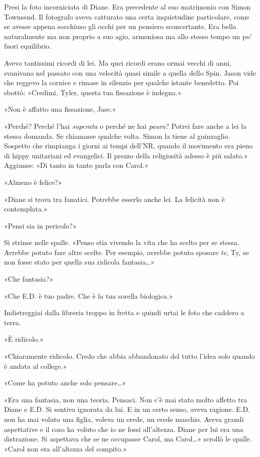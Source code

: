 Presi la foto incorniciata di Diane. Era precedente al suo matrimonio
con Simon Townsend. Il fotografo aveva catturato una certa inquietudine
particolare, come se avesse appena socchiuso gli occhi per un pensiero
sconcertante. Era bella naturalmente ma non proprio a suo agio,
armoniosa ma allo stesso tempo un po' fuori equilibrio.

Avevo tantissimi ricordi di lei. Ma quei ricordi erano ormai vecchi di
anni, svanivano nel passato con una velocità quasi simile a quella dello
Spin. Jason vide che reggevo la cornice e rimase in silenzio per qualche
istante benedetto. Poi sbottò: «Credimi, Tyler, questa tua fissazione è
indegna.»

«Non è affatto una fissazione, Jase.»

«Perché? Perché l'hai \emph{superata} o perché ne hai \emph{paura}?
Potrei fare anche a lei la stessa domanda. Se chiamasse qualche volta.
Simon la tiene al guinzaglio. Sospetto che rimpianga i giorni ai tempi
dell'NR, quando il movimento era pieno di hippy unitariani ed
evangelici. Il prezzo della religiosità adesso è più salato.» Aggiunse:
«Di tanto in tanto parla con Carol.»

«Almeno è felice?»

«Diane si trova tra fanatici. Potrebbe esserlo anche lei. La felicità
non è contemplata.»

«Pensi sia in pericolo?»

Si strinse nelle spalle. «Penso stia vivendo la vita che ha scelto per
se stessa. Avrebbe potuto fare altre scelte. Per esempio, avrebbe potuto
sposare \emph{te}, Ty, se non fosse stato per quella sua ridicola
fantasia\ldots»

«Che fantasia?»

«Che E.D. è tuo padre. Che è la tua sorella biologica.»

Indietreggiai dalla libreria troppo in fretta e quindi urtai le foto che
caddero a terra.

«È ridicolo.»

«Chiaramente ridicolo. Credo che abbia abbandonato del tutto l'idea solo
quando è andata al college.»

«Come ha potuto anche solo pensare\ldots»

«Era una fantasia, non una teoria. Pensaci. Non c'è mai stato molto
affetto tra Diane e E.D. Si sentiva ignorata da lui. E in un certo
senso, aveva ragione. E.D. non ha mai voluto una figlia, voleva un
erede, un erede maschio. Aveva grandi aspettative e il caso ha voluto
che io ne fossi all'altezza. Diane per lui era una distrazione. Si
aspettava che se ne occupasse Carol, ma Carol\ldots» scrollò le spalle.
«Carol non era all'altezza del compito.»

